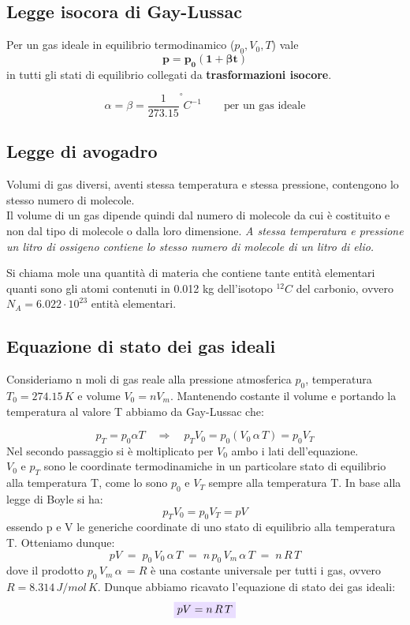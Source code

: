 \documentclass[x11names]{report}
\newcommand{\viola}[1]{\colorbox{yred}{$\displaystyle #1$}}
\begin{document}
	\begin{center}
		\colorbox{yred}{\begin{minipage}{5.75in}
				\begin{redes}{}
					\subsection{Legge isocora di Gay-Lussac}
					Per un gas ideale in equilibrio termodinamico (\(p_{0}, V_{0}, T\)) vale
					\[ 
					\boldsymbol{p = p_0(1 + \beta t)}
					\]
					in tutti gli stati di equilibrio collegati da \textbf{trasformazioni isocore}.
					
					\[ 
					\alpha = \beta = \frac{1}{273.15} ^\circ C^{-1} \qquad \text{per un gas ideale}
					\]
				\end{redes}
		\end{minipage}}
	\end{center}
	
	
	\subsection{Legge di avogadro}
	Volumi di gas diversi, aventi stessa temperatura e stessa pressione, contengono lo stesso numero di molecole.\\
	Il volume di un gas dipende quindi dal numero di molecole da cui è costituito e non dal tipo di molecole o dalla loro dimensione. \textit{A stessa temperatura e pressione un litro di ossigeno contiene lo stesso numero di molecole di un litro di elio.}
	
	Si chiama mole una quantità di materia che contiene tante entità elementari quanti sono gli atomi contenuti in 0.012 kg dell'isotopo $^{12}C$ del carbonio, ovvero $N_A = 6.022\cdot10^{23}$ entità elementari. 
	
	\subsection{Equazione di stato dei gas ideali}
	Consideriamo n moli di gas reale alla pressione atmosferica $p_0$, temperatura $T_0 = 274.15\,K$ e volume $V_0 = nV_m$.
	Mantenendo costante il volume e portando la temperatura al valore T abbiamo da Gay-Lussac che: 
	
	\[ 
	p_T = p_0 \alpha T \quad \Longrightarrow \quad p_T V_0 = p_0 (V_0 \,\alpha\, T) = p_0 V_T
	\]
	Nel secondo passaggio si è moltiplicato per $V_0$ ambo i lati dell'equazione.\\ $V_0$ e $p_T$ sono le coordinate termodinamiche in un particolare stato di equilibrio alla temperatura T, come lo sono $p_0$ e $V_T$ sempre alla temperatura T. In base alla legge di Boyle si ha: 
	\[ 
	p_T V_0  = p_0 V_T = pV
	\]
	essendo p e V le generiche coordinate di uno stato di equilibrio alla temperatura T. Otteniamo dunque:
	\[ 
	pV \;=\; p_0 \,V_0\, \alpha\, T \;=\; n\, p_0\, V_m\, \alpha\, T \;=\; n\, R\, T  
	\]
	dove il prodotto $p_0\, V_m\, \alpha\, = R$  è una costante universale per tutti i gas, ovvero $R = 8.314\, J/mol\,K$. Dunque abbiamo ricavato l'equazione di stato dei gas ideali: 
	\begin{equation}
		\viola{pV = n\,R\,T }
	\end{equation}
	
\end{document}
